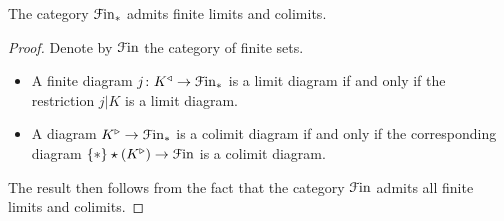 \documentclass[main.tex]{subfiles}
\begin{document}
\begin{lemma}
  The category $\mathcal{F}\mathrm{in}_{*}$ admits finite limits and colimits.
\end{lemma}
\begin{proof}
  Denote by $\mathcal{F}\mathrm{in}$ the category of finite sets.

  \begin{itemize}
    \item A finite diagram $j\colon K^{\triangleleft} \to \mathcal{F}\mathrm{in}_{*}$ is a limit diagram if and only if the restriction $j|K$ is a limit diagram.

    \item A diagram $K^{\triangleright} \to \mathcal{F}\mathrm{in}_{*}$ is a colimit diagram if and only if the corresponding diagram $\{\ast\} \star (K^{\triangleright}) \to \mathcal{F}\mathrm{in}$ is a colimit diagram.
  \end{itemize}

  The result then follows from the fact that the category $\mathcal{F}\mathrm{in}$ admits all finite limits and colimits.
\end{proof}
\end{document}
